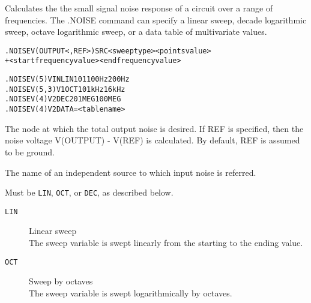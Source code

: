 



Calculates the the small signal noise response of a circuit over a range of frequencies.
The .NOISE command can specify a linear sweep, decade logarithmic sweep, octave
logarithmic sweep, or a data table of multivariate values.

\begin{Command}

\format
\begin{alltt}
  .NOISE V(OUTPUT <, REF>) SRC <sweep type> <points value>
+ <start frequency value> <end frequency value>
\end{alltt}

\examples
\begin{alltt}
  .NOISE V(5) VIN LIN 101 100Hz 200Hz
  .NOISE V(5,3) V1 OCT 10 1kHz 16kHz
  .NOISE V(4) V2 DEC 20 1MEG 100MEG
  .NOISE V(4) V2 DATA=<table name>
\end{alltt}

\arguments

\begin{Arguments}

   The node at which the total output noise is desired. If REF is 
   specified, then the noise voltage V(OUTPUT) - V(REF) is calculated. By default, 
   REF is assumed to be ground. 

   The name of an independent source to which input noise is referred. 


Must be \texttt{LIN}, \texttt{OCT}, or \texttt{DEC}, as described below.
\begin{description}

\item[\tt LIN] Linear sweep\\
The sweep variable is swept linearly from the starting to the ending value.

\item[\tt OCT] Sweep by octaves\\
The sweep variable is swept logarithmically by octaves.


\end{description}
\end{Arguments}
\end{Command}
